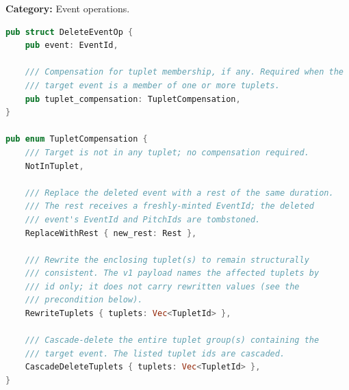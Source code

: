 \documentclass[11pt,letterpaper]{report}
\begin{document}
\textbf{Category:} Event operations.

\begin{lstlisting}[language=Rust]
pub struct DeleteEventOp {
    pub event: EventId,

    /// Compensation for tuplet membership, if any. Required when the
    /// target event is a member of one or more tuplets.
    pub tuplet_compensation: TupletCompensation,
}

pub enum TupletCompensation {
    /// Target is not in any tuplet; no compensation required.
    NotInTuplet,

    /// Replace the deleted event with a rest of the same duration.
    /// The rest receives a freshly-minted EventId; the deleted
    /// event's EventId and PitchIds are tombstoned.
    ReplaceWithRest { new_rest: Rest },

    /// Rewrite the enclosing tuplet(s) to remain structurally
    /// consistent. The v1 payload names the affected tuplets by
    /// id only; it does not carry rewritten values (see the
    /// precondition below).
    RewriteTuplets { tuplets: Vec<TupletId> },

    /// Cascade-delete the entire tuplet group(s) containing the
    /// target event. The listed tuplet ids are cascaded.
    CascadeDeleteTuplets { tuplets: Vec<TupletId> },
}
\end{lstlisting}
\end{document}
